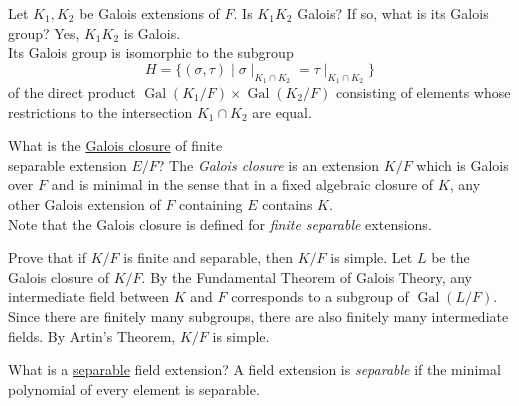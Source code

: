 \documentclass[avery5371,grid]{flashcards}
\DeclareMathOperator{\Gal}{Gal}
\begin{document}
\begin{flashcard}[Fields]{Let $K_1,K_2$ be Galois extensions of $F$. Is $K_1K_2$ Galois? If so, what is its Galois group?}
 Yes, $K_1K_2$ is Galois. \\
 
 Its Galois group is isomorphic to the subgroup
 $$
 H = \{(\sigma, \tau) \mid \sigma \mid_{K_1 \cap K_2} = \tau \mid_{K_1 \cap K_2}\}
 $$
 of the direct product $\Gal(K_1/F) \times \Gal(K_2/F)$ consisting of elements whose restrictions to the intersection $K_1 \cap K_2$ are equal.
\end{flashcard}

\begin{flashcard}[Fields]{What is the \underline{Galois closure} of finite \\separable extension $E/F$?}
 The \emph{Galois closure} is an extension $K/F$ which is Galois over $F$ and is minimal in the sense that in a fixed algebraic closure of $K$, any other Galois extension of $F$ containing $E$ contains $K$.\\
 
 Note that the Galois closure is defined for \emph{finite separable} extensions.
\end{flashcard}

\begin{flashcard}[Fields]{Prove that if $K/F$ is finite and separable, then $K/F$ is simple.}
 Let $L$ be the Galois closure of $K/F$. By the Fundamental Theorem of Galois Theory, any intermediate field between $K$ and $F$ corresponds to a subgroup of $\Gal(L/F)$. Since there are finitely many subgroups, there are also finitely many intermediate fields. By Artin's Theorem, $K/F$ is simple.
\end{flashcard}

\begin{flashcard}[Fields]{What is a \underline{separable} field extension?}
 A field extension is \emph{separable} if the minimal polynomial of every element is separable.
\end{flashcard}
\end{document}
